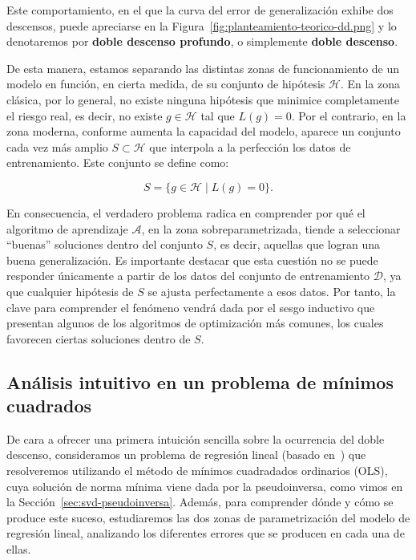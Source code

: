 Este comportamiento, en el que la curva del error de generalización exhibe dos descensos, puede apreciarse en la Figura~\ref{fig:planteamiento-teorico-dd.png} y lo denotaremos por \textbf{doble descenso profundo}, o simplemente \textbf{doble descenso}.\newline


De esta manera, estamos separando las distintas zonas de funcionamiento de un modelo en función, en cierta medida, de su conjunto de hipótesis $\mathcal{H}$. En la zona clásica, por lo general, no existe ninguna hipótesis que minimice completamente el riesgo real, es decir, no existe $g \in \mathcal{H}$ tal que $L(g) = 0$. Por el contrario, en la zona moderna, conforme aumenta la capacidad del modelo, aparece un conjunto cada vez más amplio $S \subset \mathcal{H}$ que interpola a la perfección los datos de entrenamiento. Este conjunto se define como:  

\[
    S = \{ g \in \mathcal{H} \mid L(g) = 0 \}.
\]

En consecuencia, el verdadero problema radica en comprender por qué el algoritmo de aprendizaje $\mathcal{A}$, en la zona sobreparametrizada, tiende a seleccionar ``buenas'' soluciones dentro del conjunto $S$, es decir, aquellas que logran una buena generalización. Es importante destacar que esta cuestión no se puede responder únicamente a partir de los datos del conjunto de entrenamiento $\mathcal{D}$, ya que cualquier hipótesis de $S$ se ajusta perfectamente a esos datos. Por tanto, la clave para comprender el fenómeno vendrá dada por el sesgo inductivo que presentan algunos de los algoritmos de optimización más comunes, los cuales favorecen ciertas soluciones dentro de $S$.\newline

\subsection{Análisis intuitivo en un problema de mínimos cuadrados}\label{subsec:analisis-intuitivo-minimos-cuadrados}

De cara a ofrecer una primera intuición sencilla sobre la ocurrencia del doble descenso, consideramos un problema de regresión lineal (basado en~\cite{Schaeffer2023}) que resolveremos utilizando el método de mínimos cuadradados ordinarios (OLS), cuya solución de norma mínima viene dada por la pseudoinversa, como vimos en la Sección~\ref{sec:svd-pseudoinversa}. Además, para comprender dónde y cómo se produce este suceso, estudiaremos las dos zonas de parametrización del modelo de regresión lineal, analizando los diferentes errores que se producen en cada una de ellas.\newline

